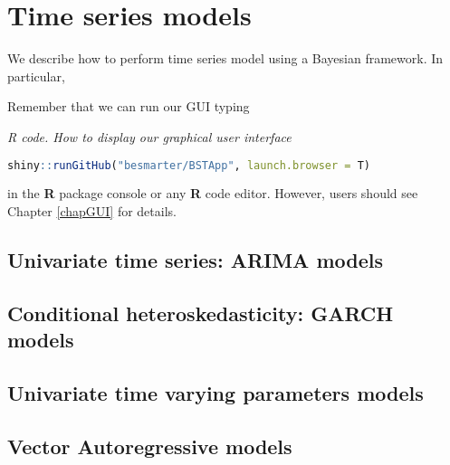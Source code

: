 \chapter{Time series models}\label{chap8}
We describe how to perform time series model using a Bayesian framework. In particular,

Remember that we can run our GUI typing

\begin{tcolorbox}[enhanced,width=4.67in,center upper,
	fontupper=\large\bfseries,drop shadow southwest,sharp corners]
	\textit{R code. How to display our graphical user interface}
	\begin{VF}
		\begin{lstlisting}[language=R]
		shiny::runGitHub("besmarter/BSTApp", launch.browser = T)\end{lstlisting}
	\end{VF}
\end{tcolorbox} 

in the \textbf{R} package console or any \textbf{R} code editor. However, users should see Chapter \ref{chapGUI} for details.

\section{Univariate time series: ARIMA models}\label{sec81}

\section{Conditional heteroskedasticity: GARCH models}\label{sec82}

\section{Univariate time varying parameters models}\label{sec83}

\section{Vector Autoregressive models}\label{sec84}
